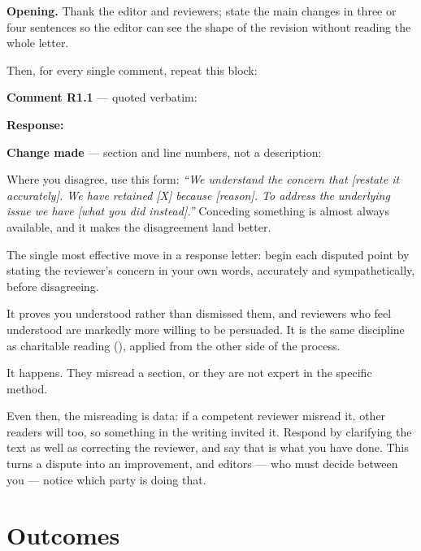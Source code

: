 \begin{templatebox}
\textbf{Opening.} Thank the editor and reviewers; state the main changes in
three or four sentences so the editor can see the shape of the revision without
reading the whole letter.

\medskip
\noindent Then, for every single comment, repeat this block:

\medskip
\noindent\textbf{Comment R1.1} --- quoted verbatim:

\noindent\textbf{Response:}

\noindent\textbf{Change made} --- section and line numbers, not a description:

\medskip
\noindent Where you disagree, use this form: \emph{``We understand the concern
that [restate it accurately]. We have retained [X] because [reason]. To address
the underlying issue we have [what you did instead].''} Conceding something is
almost always available, and it makes the disagreement land better.
\end{templatebox}

\begin{alertbox}
The single most effective move in a response letter: begin each disputed point
by stating the reviewer's concern in your own words, accurately and
sympathetically, before disagreeing.

\medskip
It proves you understood rather than dismissed them, and reviewers who feel
understood are markedly more willing to be persuaded. It is the same discipline
as charitable reading (), applied from the other side of the
process.
\end{alertbox}

\begin{conceptbox}
It happens. They misread a section, or they are not expert in the specific
method.

\medskip
Even then, the misreading is data: if a competent reviewer misread it, other
readers will too, so something in the writing invited it. Respond by clarifying
the text as well as correcting the reviewer, and say that is what you have
done. This turns a dispute into an improvement, and editors --- who must decide
between you --- notice which party is doing that.
\end{conceptbox}

\section{Outcomes}

